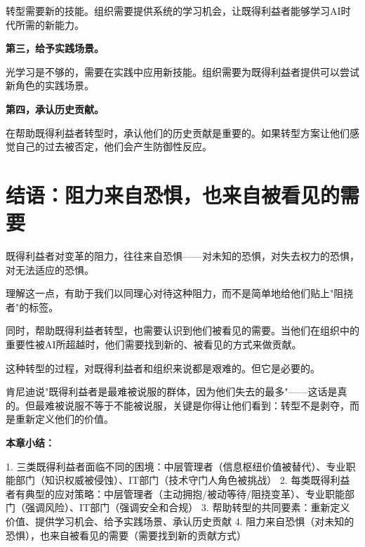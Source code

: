 转型需要新的技能。组织需要提供系统的学习机会，让既得利益者能够学习AI时代所需的新能力。

\textbf{第三，给予实践场景。}

光学习是不够的，需要在实践中应用新技能。组织需要为既得利益者提供可以尝试新角色的实践场景。

\textbf{第四，承认历史贡献。}

在帮助既得利益者转型时，承认他们的历史贡献是重要的。如果转型方案让他们感觉自己的过去被否定，他们会产生防御性反应。

\section{结语：阻力来自恐惧，也来自被看见的需要}


既得利益者对变革的阻力，往往来自恐惧——对未知的恐惧，对失去权力的恐惧，对无法适应的恐惧。

理解这一点，有助于我们以同理心对待这种阻力，而不是简单地给他们贴上"阻挠者"的标签。

同时，帮助既得利益者转型，也需要认识到他们被看见的需要。当他们在组织中的重要性被AI所超越时，他们需要找到新的、被看见的方式来做贡献。

这种转型的过程，对既得利益者和组织来说都是艰难的。但它是必要的。

肯尼迪说"既得利益者是最难被说服的群体，因为他们失去的最多"——这话是真的。但最难被说服不等于不能被说服，关键是你得让他们看到：转型不是剥夺，而是重新定义他们的价值。


\textbf{本章小结：}

1. 三类既得利益者面临不同的困境：中层管理者（信息枢纽价值被替代）、专业职能部门（知识权威被侵蚀）、IT部门（技术守门人角色被挑战）
2. 每类既得利益者有典型的应对策略：中层管理者（主动拥抱/被动等待/阻挠变革）、专业职能部门（强调风险）、IT部门（强调安全和合规）
3. 帮助转型的共同要素：重新定义价值、提供学习机会、给予实践场景、承认历史贡献
4. 阻力来自恐惧（对未知的恐惧），也来自被看见的需要（需要找到新的贡献方式）
